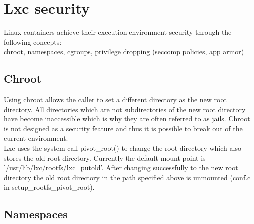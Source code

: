 \chapter{Lxc security}

Linux containers achieve their execution environment security through the following concepts:\\
chroot, namespaces, cgroups, privilege dropping (seccomp policies, app armor)\\

\section{Chroot}

Using chroot allows the caller to set a different directory as the new root directory. All directories which are not subdirectories
of the new root directory have become inaccessible which is why they are often referred to as jails. Chroot is not designed as a security
feature and thus it is possible to break out of the current environment.\\
Lxc uses the system call pivot\_root() to change the root directory which also stores the old root directory.
Currently the default mount point is '/usr/lib/lxc/rootfs/lxc\_putold'. After changing successfully to the new root directory
the old root directory in the path specified above is unmounted (conf.c in setup\_rootfs\_pivot\_root).

\section{Namespaces}

